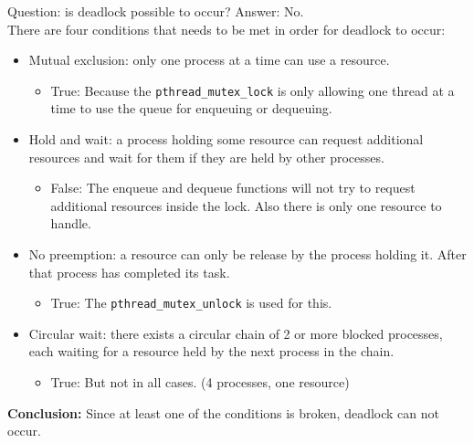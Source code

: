 \documentclass[a4paper,11pt,twoside,fleqn]{article}
\begin{document}
Question: is deadlock possible to occur? Answer: No.
\\
There are four conditions that needs to be met in order for deadlock to occur:
\begin{itemize}

\item
Mutual exclusion: only one process at a time can use a resource.
\begin{itemize} \item True: Because the \verb+pthread_mutex_lock+ is only allowing one thread at a time to use the queue for enqueuing or dequeuing.
\end{itemize}

\item Hold and wait: a process holding some resource can request additional resources and wait for them if they are held by other processes.
\begin{itemize}
\item False: The enqueue and dequeue functions will not try to request additional resources inside the lock. Also there is only one resource to handle.
\end{itemize}

\item No preemption: a resource can only be release by the process holding it. After that process has completed its task.
\begin{itemize}
\item True: The \verb+pthread_mutex_unlock+ is used for this.
\end{itemize} 

\item Circular wait: there exists a circular chain of 2 or more blocked processes, each waiting for a resource held by the next process in the chain.

\begin{itemize}
\item True: But not in all cases. (4 processes, one resource) 
\end{itemize} 
\end{itemize}

\textbf{Conclusion:} Since at least one of the conditions is broken, deadlock can not occur.

\clearpage

\end{document}
